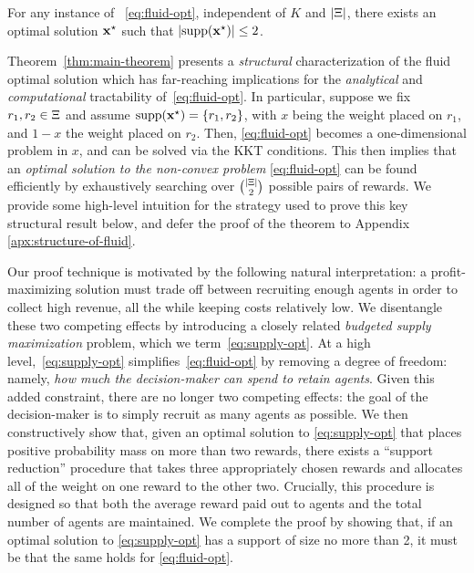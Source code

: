 \documentclass[12pt]{article}
\begin{document}
\begin{theorem}\label{thm:main-theorem}
For any instance of ~\ref{eq:fluid-opt}, independent of $K$ and $|\Xi|$, there exists an optimal solution $\normalfont{\mathbf{x}}^\star$ such that $|\text{supp}(\normalfont{\mathbf{x}}^\star)|\leq 2$.%
\end{theorem}
{Theorem~\ref{thm:main-theorem} presents a {\it structural} characterization of the fluid optimal solution which has far-reaching implications for the {\it analytical} and {\it computational} tractability of~\ref{eq:fluid-opt}.  In particular, suppose we fix $r_1,r_2 \in \Xi$ and assume $\text{supp}(\mathbf{x}^\star) = \{r_1, r_2\}$, with $x$ being the weight placed on $r_1$, and $1-x$ the weight placed on $r_2$. Then, \ref{eq:fluid-opt} becomes a {one-dimensional} problem in $x$, and can be solved via the KKT conditions. This then implies that %
an {\it optimal solution to the non-convex problem} \ref{eq:fluid-opt} can be found efficiently {by exhaustively searching over $\binom{|\Xi|}{2}$ possible pairs of rewards}.} %
We provide some high-level intuition for the strategy used to prove this key structural result below, and defer the proof of the theorem to Appendix \ref{apx:structure-of-fluid}.

Our proof technique is motivated by the following natural interpretation: a profit-maximizing solution must trade off between recruiting enough agents in order to collect high revenue, all the while keeping costs relatively low. We disentangle these two competing effects by introducing a closely related {\it budgeted supply maximization} problem, which we term~\ref{eq:supply-opt}. {At a high level,~\ref{eq:supply-opt} simplifies~\ref{eq:fluid-opt} by removing a degree of freedom: namely, {\it how much the decision-maker can spend to retain agents}. Given this added constraint, there are no longer two competing effects: the goal of the decision-maker is to simply recruit as many agents as possible.} We then constructively show that, given an optimal solution to \ref{eq:supply-opt} that places positive probability mass on more than two rewards, there exists a ``support reduction'' procedure that takes three appropriately chosen rewards and allocates all of the weight on one reward to the other two. Crucially, this procedure is designed so that both the average reward paid out to agents and the total number of agents are maintained. {We complete the proof by showing that, if an optimal solution to \ref{eq:supply-opt} has a support of size no more than 2, it must be that the same holds for \ref{eq:fluid-opt}.}
\end{document}
